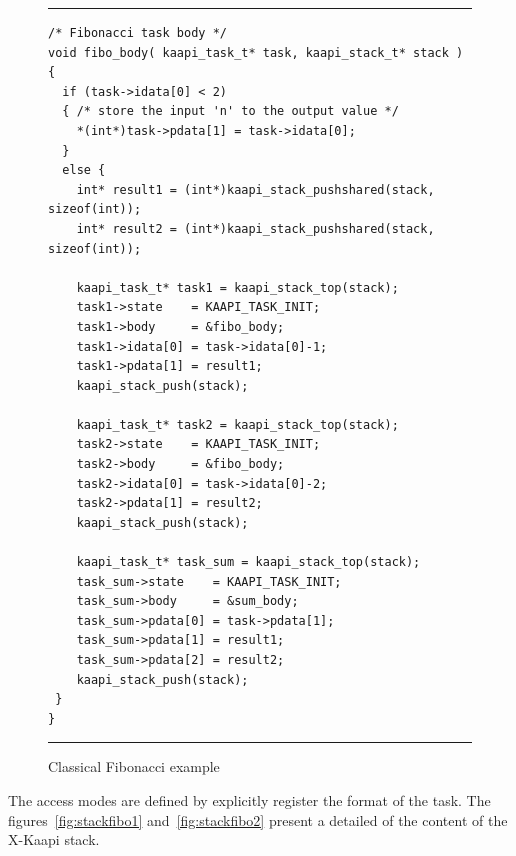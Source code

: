 \documentclass{report}
\newcommand{\kaapi}{\textsc{X}-Kaapi\xspace}
\begin{document}
\begin{figure}[!h]
\hrule
\small
\begin{verbatim}
/* Fibonacci task body */
void fibo_body( kaapi_task_t* task, kaapi_stack_t* stack )
{
  if (task->idata[0] < 2)
  { /* store the input 'n' to the output value */
    *(int*)task->pdata[1] = task->idata[0];
  }
  else {
    int* result1 = (int*)kaapi_stack_pushshared(stack, sizeof(int));
    int* result2 = (int*)kaapi_stack_pushshared(stack, sizeof(int));

    kaapi_task_t* task1 = kaapi_stack_top(stack);
    task1->state    = KAAPI_TASK_INIT;
    task1->body     = &fibo_body;
    task1->idata[0] = task->idata[0]-1;
    task1->pdata[1] = result1;
    kaapi_stack_push(stack);

    kaapi_task_t* task2 = kaapi_stack_top(stack);
    task2->state    = KAAPI_TASK_INIT;
    task2->body     = &fibo_body;
    task2->idata[0] = task->idata[0]-2;
    task2->pdata[1] = result2;
    kaapi_stack_push(stack);

    kaapi_task_t* task_sum = kaapi_stack_top(stack);
    task_sum->state    = KAAPI_TASK_INIT;
    task_sum->body     = &sum_body;
    task_sum->pdata[0] = task->pdata[1];
    task_sum->pdata[1] = result1;
    task_sum->pdata[2] = result2;
    kaapi_stack_push(stack);    
 }
}
\end{verbatim}
\hrule
\caption{Classical Fibonacci example}
\label{fig:fibo}
\end{figure}
The access modes are defined by explicitly register the format of the task.
The figures~\ref{fig:stackfibo1} and~\ref{fig:stackfibo2} present a detailed of the content of the \kaapi stack.
\end{document}
